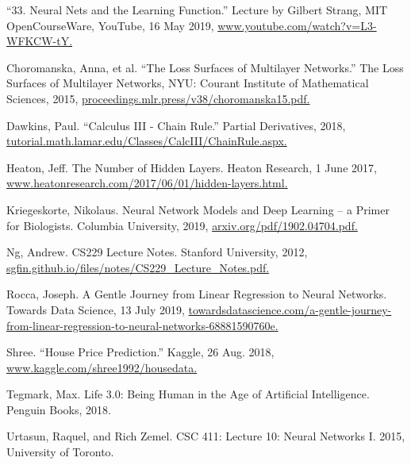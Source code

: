 \documentclass[12pt,a4paper]{article}
\begin{document}
\begin{thebibliography}{99}


 “33. Neural Nets and the Learning Function.” Lecture by Gilbert Strang, MIT OpenCourseWare, YouTube, 16 May 2019,  \url{www.youtube.com/watch?v=L3-WFKCW-tY.}



 Choromanska, Anna, et al. “The Loss Surfaces of Multilayer Networks.” The Loss Surfaces of Multilayer Networks, NYU: Courant Institute of Mathematical Sciences, 2015,  \url{proceedings.mlr.press/v38/choromanska15.pdf.}

 Dawkins, Paul. “Calculus III - Chain Rule.” Partial Derivatives, 2018,  \url{tutorial.math.lamar.edu/Classes/CalcIII/ChainRule.aspx.}

 Heaton, Jeff. The Number of Hidden Layers. Heaton Research, 1 June 2017,  \url{www.heatonresearch.com/2017/06/01/hidden-layers.html.}

 Kriegeskorte, Nikolaus. Neural Network Models and Deep Learning – a Primer for Biologists. Columbia University, 2019,  \url{arxiv.org/pdf/1902.04704.pdf.}

 Ng, Andrew. CS229 Lecture Notes. Stanford University, 2012, \url{ sgfin.github.io/files/notes/CS229_Lecture_Notes.pdf.}

 Rocca, Joseph. A Gentle Journey from Linear Regression to Neural Networks. Towards Data Science, 13 July 2019, \url{ towardsdatascience.com/a-gentle-journey-from-linear-regression-to-neural-networks-68881590760e.}

 Shree. “House Price Prediction.” Kaggle, 26 Aug. 2018,  \url{www.kaggle.com/shree1992/housedata.}

 Tegmark, Max. Life 3.0: Being Human in the Age of Artificial Intelligence. Penguin Books, 2018.

 Urtasun, Raquel, and Rich Zemel. CSC 411: Lecture 10: Neural Networks I. 2015, University of Toronto.




\end{thebibliography}
\end{document}
